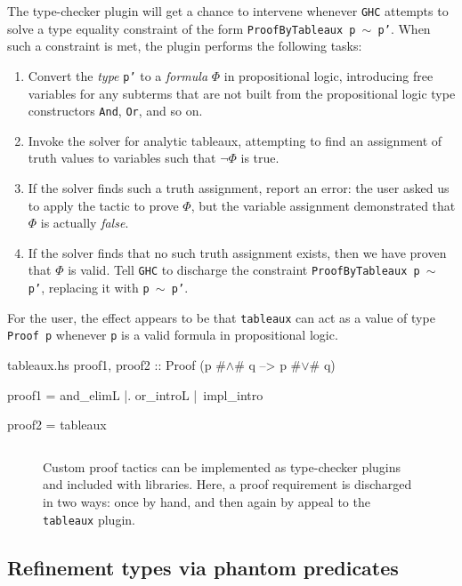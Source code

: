\documentclass[format=sigplan, review=false, screen=true]{acmart}
\begin{document}
The type-checker plugin will get a chance to intervene whenever \texttt{GHC}
attempts to solve a type equality constraint of the form \texttt{ProofByTableaux p $\sim$ p'}.
When such a constraint is met, the plugin performs the following tasks:
\begin{enumerate}
\item Convert the \emph{type} \texttt{p'} to a \emph{formula} $\Phi$ in propositional
  logic, introducing free variables for any subterms that are not built from the
  propositional logic type constructors \texttt{And}, \texttt{Or}, and so on.
\item Invoke the solver for analytic tableaux, attempting to find an assignment of truth
  values to variables such that $\neg \Phi$ is true.
\item If the solver finds such a truth assignment, report an error: the user asked us
  to apply the tactic to prove $\Phi$, but the variable assignment demonstrated that
  $\Phi$ is actually \emph{false}.
\item If the solver finds that no such truth assignment exists, then we have proven that
  $\Phi$ is valid. Tell \texttt{GHC} to discharge the constraint \texttt{ProofByTableaux p $\sim$ p'}, replacing it with \texttt{p $\sim$ p'}.
\end{enumerate}
For the user, the effect appears to be that \texttt{tableaux} can act as a value of
type \texttt{Proof p} whenever \texttt{p} is a valid formula in propositional logic.

\begin{filecontents*}{tableaux.hs}
proof1, proof2 :: Proof (p #$\wedge$# q --> p #$\vee$# q)
  
proof1 =  and_elimL
       |. or_introL
       |\ impl_intro

proof2 = tableaux
\end{filecontents*}

\begin{figure}
  \inputminted{haskell}{tableaux.hs}
  \caption{Custom proof tactics can be implemented as type-checker plugins and
    included with libraries. Here, a proof requirement is discharged in two ways:
    once by hand, and then again by appeal to the \texttt{tableaux} plugin.
    \label{tableaux-example}}
\end{figure}

\subsection{Refinement types via phantom predicates}
\end{document}
